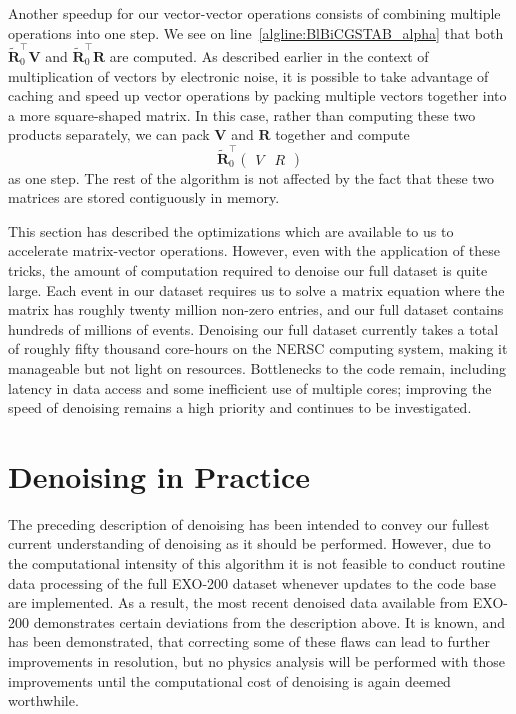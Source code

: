 Another speedup for our vector-vector operations consists of combining multiple operations into one step.  We see on line~\ref{algline:BlBiCGSTAB_alpha} that both $\mathbf{\widetilde{R}}_0^\top \mathbf{V}$ and $\mathbf{\widetilde{R}}_0^\top \mathbf{R}$ are computed.  As described earlier in the context of multiplication of vectors by electronic noise, it is possible to take advantage of caching and speed up vector operations by packing multiple vectors together into a more square-shaped matrix.  In this case, rather than computing these two products separately, we can pack $\mathbf{V}$ and $\mathbf{R}$ together and compute
\begin{equation}
\mathbf{\widetilde{R}}_0^\top \begin{pmatrix} V & R \end{pmatrix}
\end{equation}
as one step.  The rest of the algorithm is not affected by the fact that these two matrices are stored contiguously in memory.

This section has described the optimizations which are available to us to accelerate matrix-vector operations.  However, even with the application of these tricks, the amount of computation required to denoise our full dataset is quite large.  Each event in our dataset requires us to solve a matrix equation where the matrix has roughly twenty million non-zero entries, and our full dataset contains hundreds of millions of events.  Denoising our full dataset currently takes a total of roughly fifty thousand core-hours on the NERSC computing system, making it manageable but not light on resources.  Bottlenecks to the code remain, including latency in data access and some inefficient use of multiple cores; improving the speed of denoising remains a high priority and continues to be investigated.

\section{Denoising in Practice}\label{sec:DenoisingInPractice}

The preceding description of denoising has been intended to convey our fullest current understanding of denoising as it should be performed.  However, due to the computational intensity of this algorithm it is not feasible to conduct routine data processing of the full EXO-200 dataset whenever updates to the code base are implemented.  As a result, the most recent denoised data available from EXO-200 demonstrates certain deviations from the description above.  It is known, and has been demonstrated, that correcting some of these flaws can lead to further improvements in resolution, but no physics analysis will be performed with those improvements until the computational cost of denoising is again deemed worthwhile.

